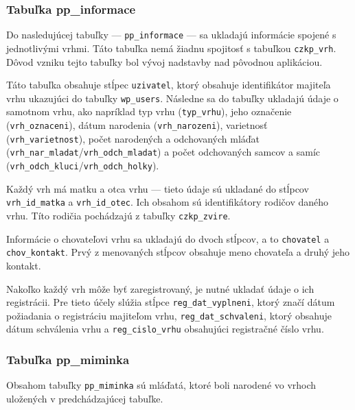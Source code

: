 \subsubsection*{Tabuľka pp\_informace}

Do nasledujúcej tabuľky --- \texttt{pp_informace} --- sa ukladajú informácie spojené s jednotlivými vrhmi. Táto tabuľka nemá žiadnu spojitosť s tabuľkou \texttt{czkp_vrh}. Dôvod vzniku tejto tabuľky bol vývoj nadstavby nad pôvodnou aplikáciou.

Táto tabuľka obsahuje stĺpec \texttt{uzivatel}, ktorý obsahuje identifikátor majiteľa vrhu ukazujúci do tabuľky \texttt{wp_users}. Následne sa do tabuľky ukladajú údaje o samotnom vrhu, ako napríklad typ vrhu (\texttt{typ_vrhu}), jeho označenie (\texttt{vrh_oznaceni}), dátum narodenia (\texttt{vrh_narozeni}), varietnosť \\(\texttt{vrh_varietnost}), počet narodených a odchovaných mláďat \\ (\texttt{vrh_nar_mladat}/\texttt{vrh_odch_mladat}) a počet odchovaných samcov a samíc (\texttt{vrh_odch_kluci}/\texttt{vrh_odch_holky}).

Každý vrh má matku a otca vrhu --- tieto údaje sú ukladané do stĺpcov \texttt{vrh_id_matka} a \texttt{vrh_id_otec}. Ich obsahom sú identifikátory rodičov daného vrhu. Títo rodičia pochádzajú z tabuľky \texttt{czkp_zvire}.

Informácie o chovateľovi vrhu sa ukladajú do dvoch stĺpcov, a to \texttt{chovatel} a \texttt{chov_kontakt}. Prvý z menovaných stĺpcov obsahuje meno chovateľa a druhý jeho kontakt.

Nakoľko každý vrh môže byť zaregistrovaný, je nutné ukladať údaje o ich registrácii. Pre tieto účely slúžia stĺpce  \texttt{reg_dat_vyplneni}, ktorý značí dátum požiadania o registráciu majiteľom vrhu, \texttt{reg_dat_schvaleni}, ktorý obsahuje dátum schválenia vrhu a \texttt{reg_cislo_vrhu} obsahujúci registračné číslo vrhu.

\subsubsection*{Tabuľka pp\_miminka}

Obsahom tabuľky \texttt{pp_miminka} sú mláďatá, ktoré boli narodené vo vrhoch uložených v predchádzajúcej tabuľke.

